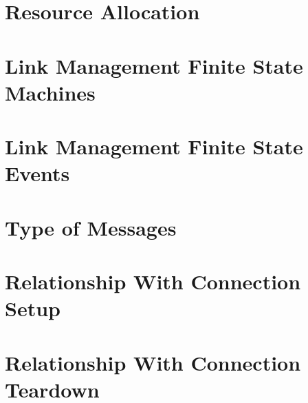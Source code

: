 \section{Resource Allocation }
\section{Link Management Finite State Machines}
\section{Link Management Finite State Events}
\section{Type of Messages}
\section{Relationship With Connection Setup}
\section{Relationship With Connection Teardown}

